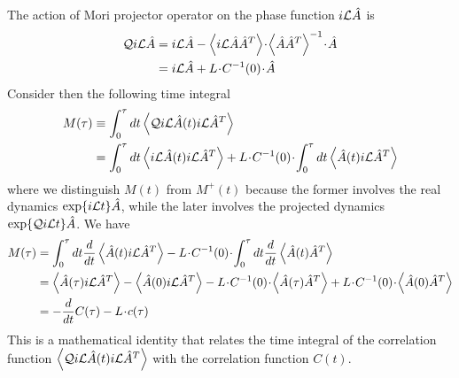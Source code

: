 \documentclass[b5paper,openright,11pt]{book}
\newcommand{\esc}{\!\cdot\!}
\newcommand{\llangle}{\left\langle}
\newcommand{\rrangle}{\right\rangle}
\begin{document}
The action  of Mori projector  operator on the phase  function $i{\cal
  L}\hat{A}$ is
\begin{align}
{\cal Q} i{\cal L}\hat{A} &= i{\cal L}\hat{A}-\llangle i{\cal L}\hat{A} \hat{A}^T\rrangle\esc \llangle\hat{A}\hat{A}^T\rrangle^{-1}\esc \hat{A}
\nonumber\\
&=
i{\cal L}\hat{A}+L\esc C^{-1}(0)\esc \hat{A}  
\label{QiLA}
\end{align}
Consider then the following time integral
\begin{align}
M(\tau)&\equiv  \int_0^{\tau} dt \llangle {\cal Q} i{\cal L}\hat{A} (t)i{\cal L}\hat{A}^T\rrangle
\nonumber\\
&=
  \int_0^{\tau} dt \llangle i{\cal L}\hat{A}(t) i{\cal L}\hat{A}^T\rrangle
+L\esc C^{-1}(0)\esc   \int_0^{\tau} dt \llangle \hat{A}(t) i{\cal L}\hat{A}^T\rrangle
\end{align}
where we distinguish $M(t)$ from $M^+(t)$ because the former
involves  the real dynamics $\exp\{i{\cal  L}t\}\hat{A}$, while
the later involves the projected dynamics $\exp\{{\cal Q}i{\cal  L}t\}\hat{A}$.
We have
\begin{align}
M(\tau)&=
  \int_0^{\tau} dt \frac{d}{dt}\llangle \hat{A}(t) i{\cal L}\hat{A}^T\rrangle
-L\esc C^{-1}(0)\esc   \int_0^{\tau} dt \frac{d}{dt}\llangle \hat{A}(t) \hat{A}^T\rrangle
\nonumber\\
&=\llangle \hat{A}(\tau) i{\cal L}\hat{A}^T\rrangle-\llangle \hat{A}(0) i{\cal L}\hat{A}^T\rrangle
-L\esc C^{-1}(0)\esc   \llangle \hat{A}(\tau) \hat{A}^T\rrangle
+L\esc C^{-1}(0)\esc   \llangle \hat{A}(0) \hat{A}^T\rrangle
\nonumber\\
&=-\frac{d}{dt}C(\tau)-L\esc c(\tau)
\label{Math1}
\end{align}
This is a mathematical identity that  relates the time integral of the
correlation  function $\llangle  {\cal Q}  i{\cal L}\hat{A}  (t)i{\cal
  L}\hat{A}^T\rrangle$ with  the correlation  function $C(t)$. 
\end{document}
